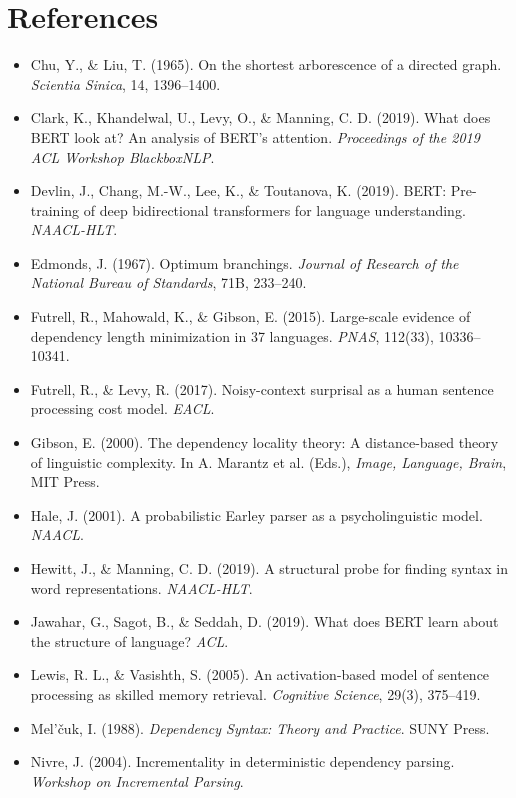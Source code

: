 \documentclass[11pt,a4paper]{article}
\begin{document}
\clearpage

\section*{References}
\begin{itemize}
    \item Chu, Y., \& Liu, T. (1965). On the shortest arborescence of a directed graph. \textit{Scientia Sinica}, 14, 1396–1400.
    \item Clark, K., Khandelwal, U., Levy, O., \& Manning, C. D. (2019). What does BERT look at? An analysis of BERT's attention. \textit{Proceedings of the 2019 ACL Workshop BlackboxNLP}.
    \item Devlin, J., Chang, M.-W., Lee, K., \& Toutanova, K. (2019). BERT: Pre-training of deep bidirectional transformers for language understanding. \textit{NAACL-HLT}.
    \item Edmonds, J. (1967). Optimum branchings. \textit{Journal of Research of the National Bureau of Standards}, 71B, 233–240.
    \item Futrell, R., Mahowald, K., \& Gibson, E. (2015). Large-scale evidence of dependency length minimization in 37 languages. \textit{PNAS}, 112(33), 10336–10341.
    \item Futrell, R., \& Levy, R. (2017). Noisy-context surprisal as a human sentence processing cost model. \textit{EACL}.
    \item Gibson, E. (2000). The dependency locality theory: A distance-based theory of linguistic complexity. In A. Marantz et al. (Eds.), \textit{Image, Language, Brain}, MIT Press.
    \item Hale, J. (2001). A probabilistic Earley parser as a psycholinguistic model. \textit{NAACL}.
    \item Hewitt, J., \& Manning, C. D. (2019). A structural probe for finding syntax in word representations. \textit{NAACL-HLT}.
    \item Jawahar, G., Sagot, B., \& Seddah, D. (2019). What does BERT learn about the structure of language? \textit{ACL}.
    \item Lewis, R. L., \& Vasishth, S. (2005). An activation-based model of sentence processing as skilled memory retrieval. \textit{Cognitive Science}, 29(3), 375–419.
    \item Mel'čuk, I. (1988). \textit{Dependency Syntax: Theory and Practice}. SUNY Press.
    \item Nivre, J. (2004). Incrementality in deterministic dependency parsing. \textit{Workshop on Incremental Parsing}.

\end{itemize}
\end{document}
